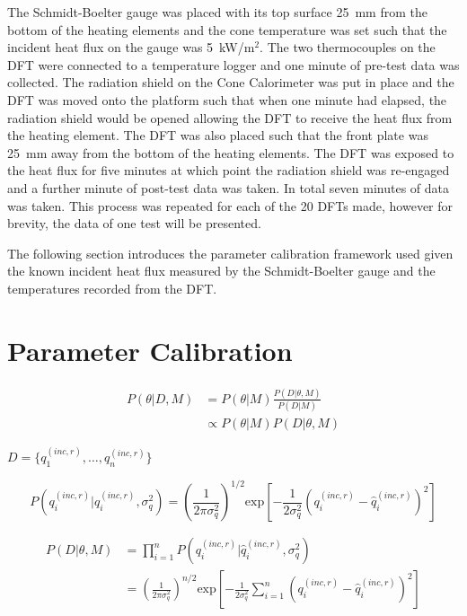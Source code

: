 \documentclass[article]{proc}
\begin{document}
    The Schmidt-Boelter gauge was placed with its top surface 25~mm from the bottom of the heating elements and the cone temperature was set such that the incident heat flux on the gauge was 5~kW/m$^2$. The two thermocouples on the DFT were connected to a temperature logger and one minute of pre-test data was collected. The radiation shield on the Cone Calorimeter was put in place and the DFT was moved onto the platform such that when one minute had elapsed, the radiation shield would be opened allowing the DFT to receive the heat flux from the heating element. The DFT was also placed such that the front plate was 25~mm away from the bottom of the heating elements. The DFT was exposed to the heat flux for five minutes at which point the radiation shield was re-engaged and a further minute of post-test data was taken. In total seven minutes of data was taken. This process was repeated for each of the 20 DFTs made, however for brevity, the data of one test will be presented. 

    The following section introduces the parameter calibration framework used given the known incident heat flux measured by the Schmidt-Boelter gauge and the temperatures recorded from the DFT. 

    \section{Parameter Calibration}

    \begin{align}\label{eq:bayes}
        P(\theta | D, M) &= P(\theta|M) \frac{P(D|\theta, M)}{P(D|M)}\\
            &\propto P(\theta|M) P(D|\theta, M)
    \end{align}

    \noindent $D = \{q^{(inc,r)}_1, \dots, q^{(inc,r)}_n \}$

    \begin{equation}\label{eq:likelihood}
        P(q_i^{(inc,r)}| \hat{q}_i^{(inc,r)}, \sigma_q^2) = \left(\frac{1}{2 \pi \sigma_q^2} \right)^{1/2} \text{exp} \left[-\frac{1}{2 \sigma_q^2} \left( q_i^{(inc,r)} - \hat{q}_i^{(inc,r)} \right)^2 \right]
    \end{equation}

    \begin{align}\label{eq:likelihood_2}
        P(D| \theta, M) &= \prod_{i=1}^n P(q_i^{(inc,r)}| \hat{q}_i^{(inc,r)}, \sigma_q^2) \\
        &= \left(\frac{1}{2 \pi \sigma_q^2} \right)^{n/2} \text{exp} \left[-\frac{1}{2 \sigma_q^2} \sum_{i=1}^n \left(q_i^{(inc,r)} - \hat{q}_i^{(inc,r)} \right)^2 \right]
    \end{align}
\end{document}
